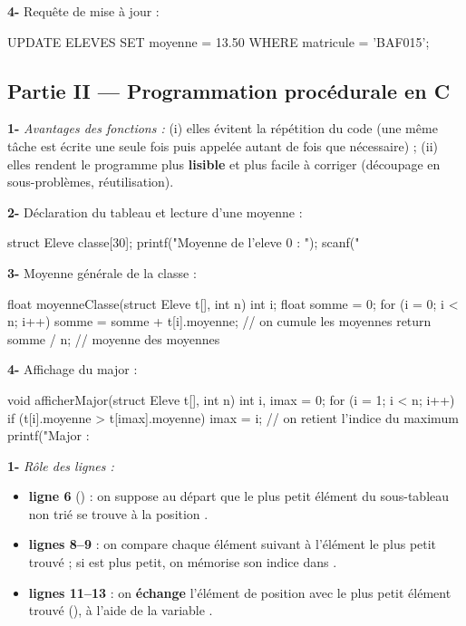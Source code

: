 \smallskip
\textbf{4-} Requête de mise à jour :
\begin{codesql}
UPDATE ELEVES SET moyenne = 13.50 WHERE matricule = 'BAF015';
\end{codesql}

\subsection*{Partie II — Programmation procédurale en C}


\textbf{1-} \emph{Avantages des fonctions :} (i) elles évitent la répétition du code
(une même tâche est écrite une seule fois puis appelée autant de fois que nécessaire) ;
(ii) elles rendent le programme plus \textbf{lisible} et plus facile à corriger
(découpage en sous-problèmes, réutilisation).

\smallskip
\textbf{2-} Déclaration du tableau et lecture d'une moyenne :
\begin{codec}
struct Eleve classe[30];
printf("Moyenne de l'eleve 0 : ");
scanf("%
\end{codec}

\smallskip
\textbf{3-} Moyenne générale de la classe :
\begin{codec}
float moyenneClasse(struct Eleve t[], int n) {
  int i;
  float somme = 0;
  for (i = 0; i < n; i++)
    somme = somme + t[i].moyenne;   // on cumule les moyennes
  return somme / n;                 // moyenne des moyennes
}
\end{codec}

\smallskip
\textbf{4-} Affichage du major :
\begin{codec}
void afficherMajor(struct Eleve t[], int n) {
  int i, imax = 0;
  for (i = 1; i < n; i++) {
    if (t[i].moyenne > t[imax].moyenne)
      imax = i;                     // on retient l'indice du maximum
  }
  printf("Major : %
}
\end{codec}


\textbf{1-} \emph{Rôle des lignes :}
\begin{itemize}
\item \textbf{ligne 6} () : on suppose au départ que le plus petit
élément du sous-tableau non trié se trouve à la position .
\item \textbf{lignes 8--9} : on compare chaque élément suivant à l'élément le plus
petit trouvé ; si  est plus petit, on mémorise son indice dans .
\item \textbf{lignes 11--13} : on \textbf{échange} l'élément de position  avec
le plus petit élément trouvé (), à l'aide de la variable .
\end{itemize}

